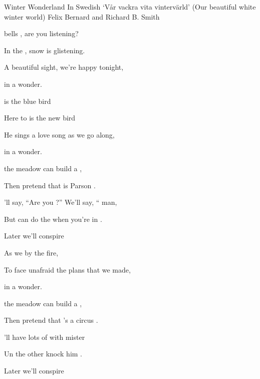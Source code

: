 \begin{SBSong}{Winter Wonderland}
    {In Swedish `V\aa r vackra vita vinterv\"arld' (Our beautiful white winter world)}
    {Felix Bernard and Richard B. Smith }
  \begin{SBVerse}
     bells , are you listening?
    
    In the , snow is glistening.
    
    A beautiful sight, we're happy tonight,
    
     in a  wonder.
  \end{SBVerse}
  \begin{SBVerse}
      is the blue bird
    
    Here to  is the new bird
    
    He sings a love song as we go along,
    
     in a  wonder.
  \end{SBVerse}
  \begin{SBVerse}
     the meadow  can build a ,
    
    Then pretend that  is Parson .
    
    'll say, ``Are you  ?'' We'll say, `` man,
    
    But  can do the  when you're in .
  \end{SBVerse}
  \WBPageBrk
  \begin{SBVerse}
    Later  we'll conspire
    
    As we  by the fire,
    
    To face unafraid the plans that we made,
    
     in a  wonder.
  \end{SBVerse}
  \begin{SBVerse}
     the meadow  can build a ,
    
    Then pretend that 's a circus .
    
    'll have lots of  with mister 
    
    Un the other  knock him .
  \end{SBVerse}
  \begin{SBVerse}
    Later  we'll conspire
    

\end{SBVerse}
\end{SBSong}
